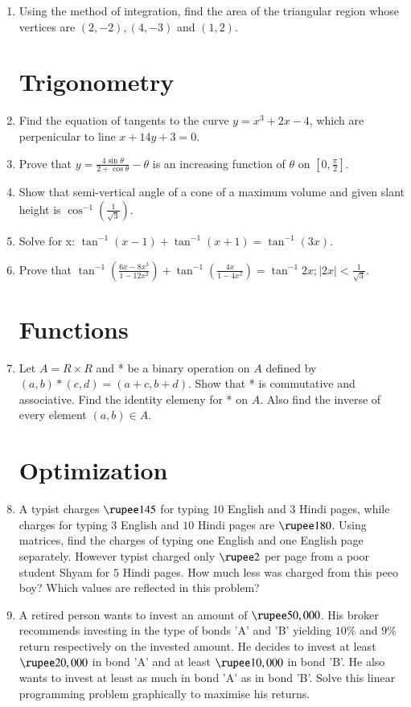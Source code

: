\documentclass[10pt,-letter paper]{article}
\providecommand{\brak}[1]{\ensuremath{\left(#1\right)}}
\providecommand{\abs}[1]{\left\vert#1\right\vert}
\begin{document}
\begin{enumerate}
\item Using the method of integration, find the area of the triangular region whose vertices are $(2,-2), (4,-3)$ and $(1,2)$.

\section{Trigonometry}

\item Find the equation of tangents to the curve $y=x^3+2x-4$, which are perpenicular to line $x+14y+3=0$.

\item Prove that $y = \frac{4\sin\theta}{2+\cos\theta} - \theta$ is an increasing function of $\theta$ on $\left [0, \frac{\pi}{2}\right ]$.

\item Show that semi-vertical angle of a cone of a maximum volume and given slant height is $\cos^{-1}\brak{\frac{1}{\sqrt{3}}}$.

\item Solve for x: $\tan^{-1}(x-1) + \tan^{-1}(x+1) = \tan^{-1}(3x)$.

\item Prove that $\tan^{-1}\brak{\frac{6x-8x^3}{1-12x^2}} + \tan^{-1}\brak{\frac{4x}{1-4x^2}} = \tan^{-1}2x; \abs{2x}<\frac{1}{\sqrt{3}}$.

\section{Functions}

\item Let $A=R\times R$ and * be a binary operation on $A$ defined by $(a,b)*(c,d) = (a+c,b+d)$.
Show that * is commutative and associative. Find the identity elemeny for * on $A$. Also find the inverse of every element $(a, b) \in A$.

\section{Optimization}

\item A typist charges $\rupee 145$ for typing $10$ English and $3$ Hindi pages, while charges for typing $3$ English and $10$ Hindi pages are $\rupee 180$. Using matrices, find the charges of typing one English and one English page separately. However typist charged only $\rupee 2$ per page from a poor student Shyam for $5$ Hindi pages. How much less was charged from this peeo boy? Which values are reflected in this problem?

\item A retired person wants to invest an amount of $\rupee 50,000$. His broker recommends investing in the type of bonds 'A' and 'B' yielding $10\%$ and $9\%$ return respectively on the invested amount. He decides to invest at least $\rupee 20,000$ in bond 'A' and at least $\rupee 10,000$ in bond 'B'. He also wants to invest at least as much in bond 'A' as in bond 'B'. Solve this linear programming problem graphically to maximise his returns.

\end{enumerate}
\end{document}
